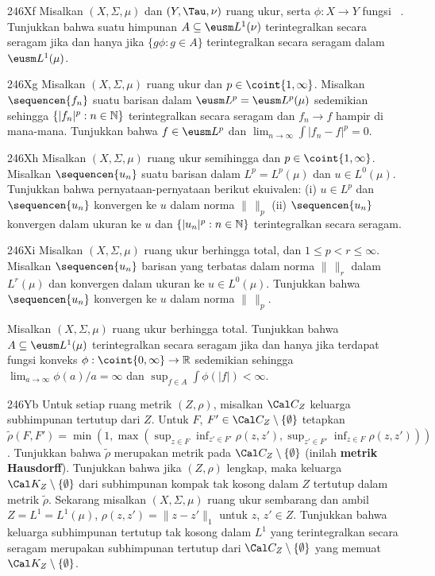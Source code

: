 {\spheader 246Xf Misalkan $(X,\Sigma,\mu)$ dan $(Y,\Tau,\nu)$ ruang ukur,
serta $\phi:X\to Y$ fungsi \imp\ . Tunjukkan bahwa suatu himpunan
$A\subseteq\eusm L^1(\nu)$ terintegralkan secara seragam jika dan hanya
jika $\{g\phi:g\in A\}$ terintegralkan secara seragam dalam
$\eusm L^1(\mu)$. 

\sqheader 246Xg Misalkan $(X,\Sigma,\mu)$ ruang ukur dan
$p\in\coint{1,\infty}$. Misalkan $\sequencen{f_n}$ suatu barisan dalam
$\eusm L^p=\eusm L^p(\mu)$ sedemikian sehingga $\{|f_n|^p:n\in\Bbb N\}$
terintegralkan secara seragam dan $f_n\to f$ hampir di mana-mana. Tunjukkan
bahwa $f\in\eusm L^p$ dan $\lim_{n\to\infty}\int|f_n-f|^p=0$.

\spheader 246Xh Misalkan $(X,\Sigma,\mu)$ ruang ukur semihingga dan
$p\in\coint{1,\infty}$. Misalkan $\sequencen{u_n}$ suatu barisan dalam
$L^p=L^p(\mu)$ dan $u\in L^0(\mu)$. Tunjukkan bahwa pernyataan-pernyataan
berikut ekuivalen: (i) $u\in L^p$ dan $\sequencen{u_n}$ konvergen ke $u$
dalam norma $\|\,\|_p$
(ii) $\sequencen{u_n}$ konvergen dalam ukuran ke $u$ dan $\{|u_n|^p:n\in\Bbb
N\}$ terintegralkan secara seragam. 

\spheader 246Xi Misalkan $(X,\Sigma,\mu)$ ruang ukur berhingga total, dan
$1\le p<r\le\infty$. Misalkan $\sequencen{u_n}$ barisan yang terbatas dalam
norma $\|\,\|_r$ dalam $L^r(\mu)$ dan konvergen dalam ukuran ke $u\in
L^0(\mu)$. Tunjukkan bahwa $\sequencen{u_n}$ konvergen ke $u$ dalam norma
$\|\,\|_p$. 

\ifdim\pagewidth>467pt\fontdimen4\tenrm=1.5pt\fi Misalkan $(X,\Sigma,\mu)$
ruang ukur berhingga total. Tunjukkan bahwa $A\subseteq\eusm
L^1(\mu)$ terintegralkan secara seragam jika dan hanya jika terdapat fungsi
konveks $\phi:\coint{0,\infty}\to\Bbb R$ sedemikian sehingga
$\lim_{a\to\infty}\phi(a)/a=\infty$ dan $\sup_{f\in A}\int\phi(|f|)<\infty$.
\tenrm=1.11pt

\spheader 246Yb Untuk setiap ruang metrik $(Z,\rho)$, misalkan $\Cal C_Z$
keluarga subhimpunan tertutup dari $Z$. Untuk $F$,
$F'\in\Cal C_Z\setminus\{\emptyset\}$ tetapkan
$\tilde\rho(F,F')=\min(1,\max(\sup_{z\in F}\inf_{z'\in F'}\rho(z,z'),
\sup_{z'\in F'}\inf_{z\in F}\rho(z,z')))$. Tunjukkan bahwa $\tilde\rho$
merupakan metrik pada $\Cal C_Z\setminus\{\emptyset\}$ (inilah {\bf metrik
Hausdorff}). Tunjukkan bahwa jika $(Z,\rho)$ lengkap, maka keluarga
$\Cal K_Z\setminus\{\emptyset\}$ dari subhimpunan kompak tak kosong dalam $Z$
tertutup dalam metrik $\tilde\rho$. Sekarang misalkan $(X,\Sigma,\mu)$ ruang ukur
sembarang dan ambil $Z=L^1=L^1(\mu)$,
$\rho(z,z')=\|z-z'\|_1$ untuk $z$, $z'\in Z$. Tunjukkan bahwa keluarga
subhimpunan tertutup tak kosong dalam $L^1$ yang terintegralkan secara seragam
merupakan subhimpunan tertutup dari
$\Cal C_Z\setminus\{\emptyset\}$ yang memuat
$\Cal K_Z\setminus\{\emptyset\}$.

}
